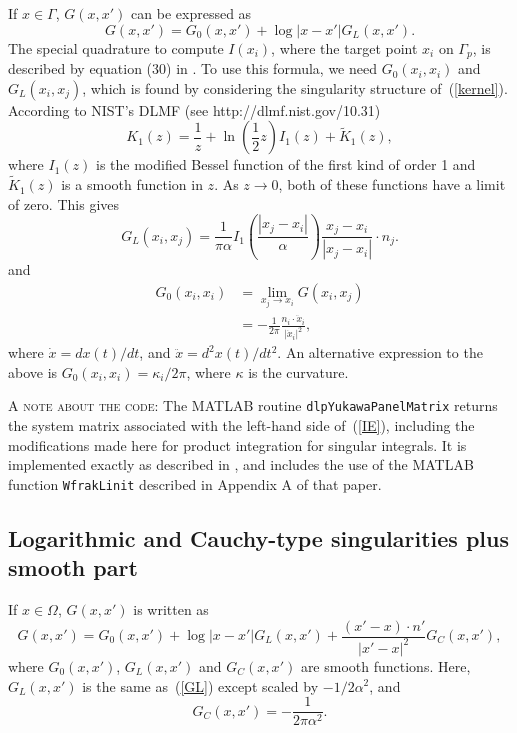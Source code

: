 \documentclass[12pt]{article}
\newcommand{\eqr}[1]{~(\ref{#1})}
\begin{document}
If $x\in \Gamma$, $G(x, x')$ can be expressed as 
\begin{equation}
G(x, x') = G_0(x, x') + \log|x - x'| G_L(x, x'). \label{Gon}
\end{equation}
The special quadrature to compute $I(x_i)$, where the target point $x_i$ on $\Gamma_p$, is described by equation (30) in \cite{HelsingHolst}.  To use this formula, we need $G_0(x_i, x_i)$ and $G_L(x_i, x_j)$, which is found by considering the singularity structure of\eqr{kernel}. 
According to NIST's DLMF (see http://dlmf.nist.gov/10.31)
\[
K_1(z)  = \frac{1}{z} + \ln \left( \frac{1}{2} z \right) I_1(z) + \tilde K_1(z),
\]
where $I_1(z)$ is the modified Bessel function of the first kind  of order 1 and $\tilde K_1(z)$ is a smooth function in $z$. As $z\rightarrow 0$, both of these functions have a  limit of zero. 
This gives
\begin{equation}
G_L(x_i, x_j)  = \frac{1}{\pi \alpha} I_1\left(\frac{|x_j - x_i |}{\alpha} \right)\frac{x_j - x_i }{|x_j - x_i|} \cdot n_j.
\label{GL}
\end{equation}
and
\begin{align*}
G_0(x_i, x_i) & = \lim_{x_j \rightarrow x_i} G(x_i, x_j) \\
                     &  = - \frac{1}{2\pi} \frac{ n_i \cdot \ddot{x}_i }{|\dot{x}_i|^2 }, 
\end{align*}
where $\dot{x} = dx(t)/dt$, and $\ddot{x} = d^2 x(t)/ dt^2$. An alternative expression to the above is $G_0(x_i, x_i) = \kappa_i/ 2 \pi$, where $\kappa$ is the curvature.

\noindent
\textsc{A note about the code:} The MATLAB routine \texttt{dlpYukawaPanelMatrix} returns the system matrix associated with the left-hand side of\eqr{IE}, including the modifications made here for product integration for singular integrals. It is implemented exactly as described in \cite{HelsingHolst}, and includes the use of the MATLAB function \texttt{WfrakLinit} described in Appendix A of that paper. 


\subsection{Logarithmic and Cauchy-type singularities plus smooth part} 
If $x\in\Omega$, $G(x, x')$ is written as 
\begin{equation}
G(x, x') = G_0(x, x') + \log|x - x'| G_L(x, x') + \frac{(x' - x) \cdot n' }{|x' - x|^2} G_C(x, x'), \label{G}
\end{equation}
where $G_0(x, x')$, $G_L(x, x')$ and $G_C(x, x')$ are smooth functions. 
Here, $G_L(x, x')$ is the same as\eqr{GL} except scaled by $-1/2 \alpha^2$, and
\[
G_C(x, x') = -\frac{1}{2\pi \alpha^2}.
\]
\end{document}
